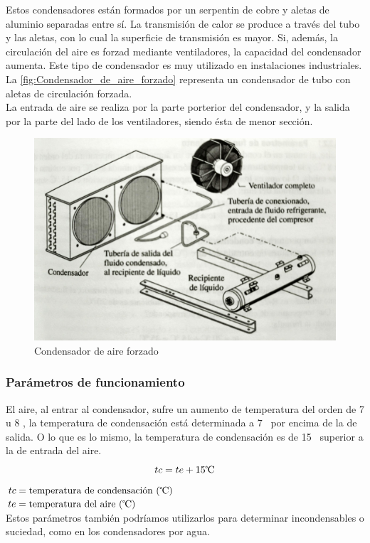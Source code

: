 Estos condensadores est\'an formados por un serpentin de cobre y aletas de aluminio separadas entre s\'i. La transmisi\'on de calor se produce a trav\'es del tubo y las aletas, con lo cual la superficie de transmisi\'on es mayor. Si, adem\'as, la circulaci\'on del aire es forzad mediante ventiladores, la capacidad del condensador aumenta. Este tipo de condensador es muy utilizado en instalaciones industriales.\\La \autoref{fig:Condensador_de_aire_forzado} representa un condensador de tubo con aletas de circulaci\'on forzada.\\La entrada de aire se realiza por la parte porterior del condensador, y la salida por la parte del lado de los ventiladores, siendo \'esta de menor secci\'on.
\begin{figure}[H]
    \centering
    \includegraphics[width=.6\linewidth]{figuras/condensadores/condensador de aire forzado.jpg}
    \caption{Condensador de aire forzado}
    \label{fig:Condensador_de_aire_forzado}
\end{figure}

\subsubsection{Par\'ametros de funcionamiento}

El aire, al entrar al condensador, sufre un aumento de temperatura del orden de 7 u 8 \textcelsius, la temperatura de condensaci\'on est\'a determinada a 7 \textcelsius\ por encima de la de salida. O lo que es lo mismo, la temperatura de condensaci\'on es de 15 \textcelsius\ superior a la de entrada del aire.
\begin{equation*}
    tc = te + 15 \text{\textcelsius}
\end{equation*}
$tc = \text{temperatura de condensaci\'on (\textcelsius)}$\\
$te = \text{temperatura del aire (\textcelsius)}$\\
Estos par\'ametros tambi\'en podr\'iamos utilizarlos para determinar incondensables o suciedad, como en los condensadores por agua.

